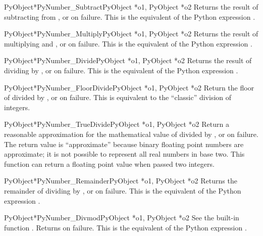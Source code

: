 \begin{cfuncdesc}{PyObject*}{PyNumber_Subtract}{PyObject *o1, PyObject *o2}
  Returns the result of subtracting  from , or \NULL{}
  on failure.  This is the equivalent of the Python expression
  .
\end{cfuncdesc}


\begin{cfuncdesc}{PyObject*}{PyNumber_Multiply}{PyObject *o1, PyObject *o2}
  Returns the result of multiplying  and , or \NULL{}
  on failure.  This is the equivalent of the Python expression
  .
\end{cfuncdesc}


\begin{cfuncdesc}{PyObject*}{PyNumber_Divide}{PyObject *o1, PyObject *o2}
  Returns the result of dividing  by , or \NULL{} on
  failure.  This is the equivalent of the Python expression
  .
\end{cfuncdesc}


\begin{cfuncdesc}{PyObject*}{PyNumber_FloorDivide}{PyObject *o1, PyObject *o2}
  Return the floor of  divided by , or \NULL{} on
  failure.  This is equivalent to the ``classic'' division of
  integers.
\end{cfuncdesc}


\begin{cfuncdesc}{PyObject*}{PyNumber_TrueDivide}{PyObject *o1, PyObject *o2}
  Return a reasonable approximation for the mathematical value of
   divided by , or \NULL{} on failure.  The return
  value is ``approximate'' because binary floating point numbers are
  approximate; it is not possible to represent all real numbers in
  base two.  This function can return a floating point value when
  passed two integers.
\end{cfuncdesc}


\begin{cfuncdesc}{PyObject*}{PyNumber_Remainder}{PyObject *o1, PyObject *o2}
  Returns the remainder of dividing  by , or \NULL{}
  on failure.  This is the equivalent of the Python expression
  .
\end{cfuncdesc}


\begin{cfuncdesc}{PyObject*}{PyNumber_Divmod}{PyObject *o1, PyObject *o2}
  See the built-in function .
  Returns \NULL{} on failure.  This is the equivalent of the Python
  expression .
\end{cfuncdesc}



